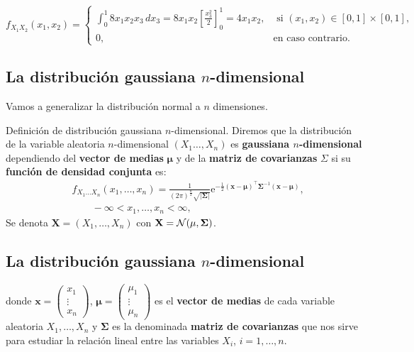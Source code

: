 \documentclass[]{book}
\begin{document}
\[
f_{X_1X_2}(x_1,x_2)=\begin{cases}
\int_{0}^1 8 x_1x_2 x_3  \, dx_3=8x_1x_2 \left[\frac{x_3^2}{2}\right]_0^1 =4 x_1 x_2, & \mbox{ si }(x_1,x_2)\in [0,1]\times [0,1],\\
0, & \mbox{en caso contrario.}
\end{cases}
\]

\hypertarget{la-distribuciuxf3n-gaussiana-n-dimensional}{%
\subsection{\texorpdfstring{La distribución gaussiana \(n\)-dimensional}{La distribución gaussiana n-dimensional}}\label{la-distribuciuxf3n-gaussiana-n-dimensional}}

Vamos a generalizar la distribución normal a \(n\) dimensiones.

Definición de distribución gaussiana \(n\)-dimensional.
Diremos que la distribución de la variable aleatoria \(n\)-dimensional \((X_1\ldots,X_n)\) es \textbf{gaussiana \(n\)-dimensional} dependiendo del \textbf{vector de medias} \(\mathbf{\mu}\) y de la \textbf{matriz de covarianzas} \(\Sigma\) si su \textbf{función de densidad conjunta} es:
\[
\begin{array}{rl}
& f_{X_1\ldots X_n}(x_1,\ldots,x_n)=\frac{1}{(2\pi)^{\frac{n}{2}}\sqrt{\mathbf{|\Sigma|}}}\mathrm{e}^{-\frac{1}{2}(\mathbf{x-\mu})^\top\mathbf{\Sigma}^{-1}(\mathbf{x-\mu})},\\ & \qquad  -\infty <x_1,\ldots,x_n<\infty,
\end{array}
\]
Se denota \(\mathbf{X}=(X_1,\ldots,X_n)\) con \(\mathbf{X}={\cal N}(\mathbf{\mu},\mathbf{\Sigma})\).

\hypertarget{la-distribuciuxf3n-gaussiana-n-dimensional-1}{%
\subsection{\texorpdfstring{La distribución gaussiana \(n\)-dimensional}{La distribución gaussiana n-dimensional}}\label{la-distribuciuxf3n-gaussiana-n-dimensional-1}}

donde \(\mathbf{x}=\begin{pmatrix}x_1\\\vdots\\ x_n\end{pmatrix}\), \(\mathbf{\mu}=\begin{pmatrix}\mu_1\\\vdots\\ \mu_n\end{pmatrix}\) es el \textbf{vector de medias} de cada variable aleatoria \(X_1,\ldots, X_n\) y \(\mathbf{\Sigma}\) es la denominada \textbf{matriz de covarianzas} que nos sirve para estudiar la relación lineal entre las variables \(X_i\), \(i=1,\ldots, n\).
\end{document}
